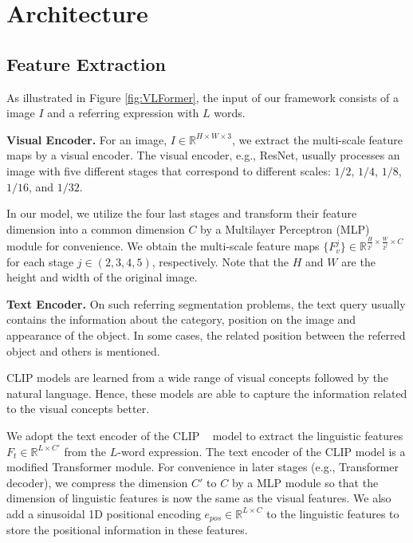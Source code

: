 \section{Architecture}
\label{sec:rvos_architecture}

\subsection{Feature Extraction}
As illustrated in Figure \ref{fig:VLFormer}, the input of our framework consists of a image $I$ and a referring expression with $L$ words. 

\textbf{Visual Encoder.}
    For an image, $I \in \mathbb{R}^{H \times W \times 3}$, we extract the multi-scale feature maps by a visual encoder. The visual encoder, e.g., ResNet, usually processes an image with five different stages that correspond to different scales: $1/2$, $1/4$, $1/8$, $1/16$, and $1/32$. 

In our model, we utilize the four last stages and transform their feature dimension into a common dimension $C$ by a Multilayer Perceptron (MLP) module for convenience. We obtain the multi-scale feature maps $\{F_v^j\} \in \mathbb{R}^{\frac{H}{2^j} \times \frac{W}{2^j} \times C}$ for each stage $j \in (2, 3, 4, 5)$, respectively.    
Note that the $H$ and $W$ are the height and width of the original image.

\textbf{Text Encoder.} 
On such referring segmentation problems, the text query usually contains the information about the category, position on the image and appearance of the object. In some cases, the related position between the referred object and others is mentioned. 

CLIP models are learned from a wide range of visual concepts followed by the natural language. Hence, these models are able to capture the information related to the visual concepts better. 

We adopt the text encoder of the CLIP ~\cite{radford_learning_2021} model to extract the linguistic features $F_t \in \mathbb{R}^{L \times C'}$ from the $L$-word expression. 
The text encoder of the CLIP model is a modified Transformer module. 
For convenience in later stages (e.g., Transformer decoder), we compress the dimension $C'$ to $C$ by a MLP module so that the dimension of linguistic features is now the same as the visual features.
We also add a sinusoidal 1D positional encoding $e_{pos} \in \mathbb{R}^{L \times C} $ to the linguistic features to store the positional information in these features.

